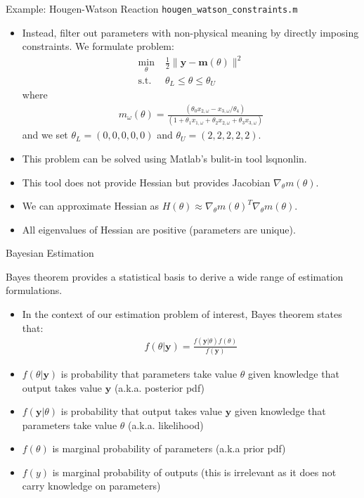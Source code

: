 \documentclass[9pt]{beamer}
\begin{document}
%
\begin{frame}{Example: Hougen-Watson Reaction \footnotesize{\texttt{hougen\_watson\_constraints.m}}}

\begin{itemize}
\setlength{\itemsep}{10pt}
\item Instead, filter out parameters with non-physical meaning by directly imposing constraints. We formulate problem:
\begin{align*}
\min_{\theta}& \; \frac{1}{2}\|\mathbf{y}- \mathbf{m}(\theta)\|^2\\ 
\textrm{s.t.}&\; \theta_L\leq \theta\leq\theta_U 
\end{align*}
where
\begin{align*}
m_\omega(\theta)=\frac{(\theta_0x_{2,\omega}-x_{3,\omega}/\theta_4)}{(1+\theta_1x_{1,\omega}+\theta_2x_{2,\omega}+\theta_3x_{3,\omega})}
\end{align*}
and we set $\theta_L=(0,0,0,0,0)$ and $\theta_U=(2,2,2,2,2)$. 
\item This problem can be solved using Matlab's bulit-in tool \textrm{lsqnonlin}. 
\item This tool does not provide Hessian but provides Jacobian $\nabla_\theta m(\theta)$. 
\item We can approximate Hessian as $H(\theta)\approx \nabla_\theta m(\theta)^T\nabla_\theta m(\theta)$.
\item All eigenvalues of Hessian are positive (parameters are unique).
\end{itemize}
\end{frame}

%
\begin{frame}{Bayesian Estimation}

Bayes theorem provides a statistical basis to derive a wide range of estimation formulations. 

\begin{itemize}
\setlength{\itemsep}{10pt}
\item In the context of our estimation problem of interest, Bayes theorem states that:
\begin{align*}
f(\theta|\mathbf{y})=\frac{f(\mathbf{y}|\theta)f(\theta)}{f(\mathbf{y})}
\end{align*}
\item $f(\theta|\mathbf{y})$ is probability that parameters take value $\theta$ given knowledge that output takes value $\mathbf{y}$ (a.k.a. posterior pdf)
\item $f(\mathbf{y}|\theta)$ is probability that output takes value $\mathbf{y}$ given knowledge that parameters take value $\theta$ (a.k.a. likelihood)
\item $f(\theta)$ is marginal probability of parameters (a.k.a prior pdf)
\item $f(y)$ is marginal probability of outputs (this is irrelevant as it does not carry knowledge on parameters)
\end{itemize}


\end{frame}
\end{document}
